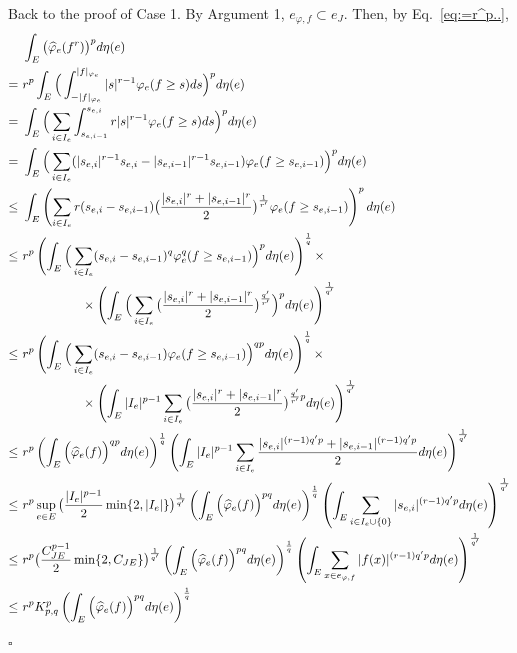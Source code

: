 \documentclass[12pt,a4paper]{article}
\newenvironment{proof}{\medskip\noindent{\bf Proof. }}{\hfill$\square$\medskip}
\begin{document}
\begin{proof}
Back to the proof of Case 1. By Argument 1, $e_{\varphi,f}\subset e_J$. 
Then, by Eq.~\eqref{eq:=r^p..}, 
\begin{align}
&\int_E\big(\widehat{\varphi}_e(f^r)\big)^pd\eta(e)\notag
\\=~& r^p\int_E\Big(\int_{-|f|_{\varphi_e}}^{|f|_{\varphi_e}} |s|^{r-1}\varphi_e(f\ge s)ds\Big)^pd\eta(e)   \notag
\\=~& \int_E\Big(\sum_{i\in I_e} \int_{s_{e,i-1}}^{s_{e,i}}r|s|^{r-1}\varphi_e(f\ge s)ds\Big)^pd\eta(e) \notag
\\=~&\int_E\Big(\sum_{i\in I_e} (|s_{e,i}|^{r-1}s_{e,i}-|s_{e,i-1}|^{r-1}s_{e,i-1})\varphi_e(f\ge s_{e,i-1})\Big)^pd\eta(e)  \label{eq:s^r-s^r}
\\ \le~&\int_E\left(\sum_{i\in I_e}r(s_{e,i}-s_{e,i-1})\big(\frac{|s_{e,i}|^r+|s_{e,i-1}|^r}{2}\big)^{\frac{1}{r'}}\varphi_e(f\ge s_{e,i-1})\right)^pd\eta(e)  \notag
\\ \le~&
r^p\left(\int_E\Big(\sum_{i\in I_e}(s_{e,i}-s_{e,i-1})^q\varphi_e^q(f\ge s_{e,i-1})\Big)^pd\eta(e)\right)^{\frac1q}\times \label{eq:Holder-twice}
\\&~~~~~~~~~~~~~~\times
\left(\int_E\Big(\sum_{i\in I_e} \big(\frac{|s_{e,i}|^r+|s_{e,i-1}|^r}{2}\big)^{\frac{q'}{r'}}\Big)^pd\eta(e)\right)^{\frac{1}{q'}}  \notag
\\ \le~&
r^p\left(\int_E\Big(\sum_{i\in I_e}(s_{e,i}-s_{e,i-1})\varphi_e(f\ge s_{e,i-1})\Big)^{qp}d\eta(e)\right)^{\frac1q}\times\label{eq:constantC}
\\&~~~~~~~~~~~~~~\times
\left(\int_E|I_e|^{p-1}\sum_{i\in I_e} \big(\frac{|s_{e,i}|^r+|s_{e,i-1}|^r}{2}\big)^{\frac{q'}{r'}p}d\eta(e)\right)^{\frac{1}{q'}} \notag
\\ \le~&
r^p\left(\int_E\Big(\widehat{\varphi}_e(f)\Big)^{qp}d\eta(e)\right)^{\frac1q}
\left(\int_E|I_e|^{p-1}\sum_{i\in I_e} \frac{|s_{e,i}|^{(r-1)q'p}+|s_{e,i-1}|^{(r-1)q'p}}{2}d\eta(e)\right)^{\frac{1}{q'}} \notag
\\ \le ~&
r^p\sup_{e\in E}\big(\frac{|I_e|^{p-1}}{2}\min \{2,|I_e|\}\big)^{\frac{1}{q'}}\left(\int_E\Big(\widehat{\varphi}_e(f)\Big)^{pq}d\eta(e)\right)^{\frac1q}
\left(\int_E\sum_{i\in I_e\cup\{0\}} |s_{e,i}|^{(r-1)q'p}d\eta(e)\right)^{\frac{1}{q'}} \label{eq:I_ecup0}
\\ \le ~&
r^p \big(\frac{C_{JE}^{p-1}}{2}\min \{2,C_{JE}\}\big)^{\frac{1}{q'}}\left(\int_E\Big(\widehat{\varphi}_e(f)\Big)^{pq}d\eta(e)\right)^{\frac1q}
\left(\int_E\sum_{x\in e_{\varphi,f}} |f(x)|^{(r-1)q'p}d\eta(e)\right)^{\frac{1}{q'}} \notag
\\ \le ~&r^p K_{p,q}^p\left(\int_E\Big(\widehat{\varphi}_e(f)\Big)^{pq}d\eta(e)\right)^{\frac1q}

\end{align}
\end{proof}
\end{document}
